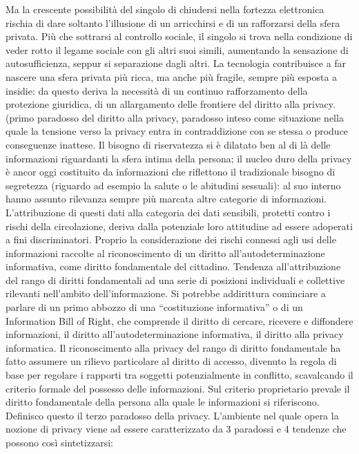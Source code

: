 Ma la crescente possibilità del singolo di chiudersi nella fortezza elettronica rischia di dare soltanto l’illusione di un arricchirsi e di un rafforzarsi della sfera privata. Più che sottrarsi al controllo sociale, il singolo si trova nella condizione di veder rotto il legame sociale con gli altri suoi simili, aumentando la sensazione di autosufficienza, seppur si separazione dagli altri.
La tecnologia contribuisce a far nascere una sfera privata più ricca, ma anche più fragile, sempre più esposta a insidie: da questo deriva la necessità di un continuo rafforzamento della protezione giuridica, di un allargamento delle frontiere del diritto alla privacy. (primo paradosso del diritto alla privacy, paradosso inteso come situazione nella quale la tensione verso la privacy entra in contraddizione con se stessa o produce conseguenze inattese.
Il bisogno di riservatezza si è dilatato ben al di là delle informazioni riguardanti la sfera intima della persona; il nucleo duro della privacy è ancor oggi costituito da informazioni che riflettono il tradizionale bisogno di segretezza (riguardo ad esempio la salute o le abitudini sessuali): al suo interno hanno assunto rilevanza sempre più marcata altre categorie di informazioni.
L’attribuzione di questi dati alla categoria dei dati sensibili, protetti contro i rischi della circolazione, deriva dalla potenziale loro attitudine ad essere adoperati a fini discriminatori. Proprio la considerazione dei rischi connessi agli usi delle informazioni raccolte al riconoscimento di un diritto all’autodeterminazione informativa, come diritto fondamentale del cittadino.
Tendenza all’attribuzione del rango di diritti fondamentali ad una serie di posizioni individuali e collettive rilevanti nell’ambito dell’informazione. Si potrebbe addirittura cominciare a parlare di un primo abbozzo di una “costituzione informativa” o di un Information Bill of Right, che comprende il diritto di cercare, ricevere e diffondere informazioni, il diritto all’autodeterminazione informativa, il diritto alla privacy informatica.
Il riconoscimento alla privacy del rango di diritto fondamentale ha fatto assumere un rilievo particolare al diritto di accesso, divenuto la regola di base per regolare i rapporti tra soggetti potenzialmente in conflitto, scavalcando il criterio formale del possesso delle informazioni. Sul criterio proprietario prevale il diritto fondamentale della persona alla quale le informazioni si riferiscono. Definisco questo il terzo paradosso della privacy.
L’ambiente nel quale opera la nozione di privacy viene ad essere caratterizzato da 3 paradossi e 4 tendenze che possono così sintetizzarsi:
